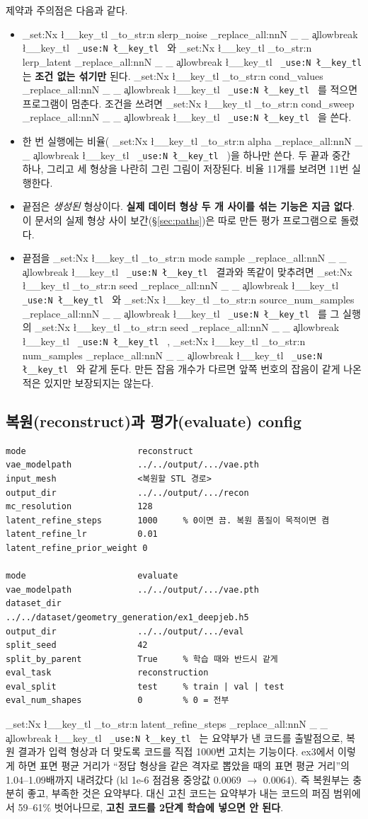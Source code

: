 \documentclass[11pt]{article}
\DeclareRobustCommand{\key}[1]{
  \tl_set:Nx \l__key_tl { \tl_to_str:n {#1} }
  \regex_replace_all:nnN { \_ } { \cO\_ \c{allowbreak} } \l__key_tl
  \texttt{ \tl_use:N \l__key_tl }
}
\begin{document}
제약과 주의점은 다음과 같다.
\begin{itemize}
\item \key{slerp_noise}와 \key{lerp_latent}는 \textbf{조건 없는 섞기만} 된다. \key{cond_values}를 적으면 프로그램이 멈춘다.
조건을 쓰려면 \key{cond_sweep}을 쓴다.
\item 한 번 실행에는 비율(\key{alpha})을 하나만 쓴다. 두 끝과 중간 하나, 그리고 세 형상을 나란히 그린 그림이 저장된다.
비율 11개를 보려면 11번 실행한다.
\item 끝점은 \emph{생성된} 형상이다. \textbf{실제 데이터 형상 두 개 사이를 섞는 기능은 지금 없다}. 이 문서의 실제 형상 사이 보간(\S\ref{sec:paths})은
따로 만든 평가 프로그램으로 돌렸다.
\item 끝점을 \key{mode sample} 결과와 똑같이 맞추려면 \key{seed}와 \key{source_num_samples}를 그 실행의 \key{seed}, \key{num_samples}와 같게 둔다.
만든 잡음 개수가 다르면 앞쪽 번호의 잡음이 같게 나온 적은 있지만 보장되지는 않는다.
\end{itemize}

\subsection{복원(reconstruct)과 평가(evaluate) config}

\begin{Verbatim}[fontsize=\small, frame=single, framesep=2mm]
mode                      reconstruct
vae_modelpath             ../../output/.../vae.pth
input_mesh                <복원할 STL 경로>
output_dir                ../../output/.../recon
mc_resolution             128
latent_refine_steps       1000     % 0이면 끔. 복원 품질이 목적이면 켬
latent_refine_lr          0.01
latent_refine_prior_weight 0

mode                      evaluate
vae_modelpath             ../../output/.../vae.pth
dataset_dir               ../../dataset/geometry_generation/ex1_deepjeb.h5
output_dir                ../../output/.../eval
split_seed                42
split_by_parent           True     % 학습 때와 반드시 같게
eval_task                 reconstruction
eval_split                test     % train | val | test
eval_num_shapes           0        % 0 = 전부
\end{Verbatim}

\key{latent_refine_steps}는 요약부가 낸 코드를 출발점으로, 복원 결과가 입력 형상과 더 맞도록 코드를 직접 1000번 고치는 기능이다.
ex3에서 이렇게 하면 표면 평균 거리가 ``정답 형상을 같은 격자로 뽑았을 때의 표면 평균 거리''의 1.04--1.09배까지 내려갔다
(kl 1e-6 점검용 중앙값 0.0069 $\rightarrow$ 0.0064). 즉 복원부는 충분히 좋고, 부족한 것은 요약부다.
대신 고친 코드는 요약부가 내는 코드의 퍼짐 범위에서 59--61\% 벗어나므로, \textbf{고친 코드를 2단계 학습에 넣으면 안 된다}.
\end{document}

